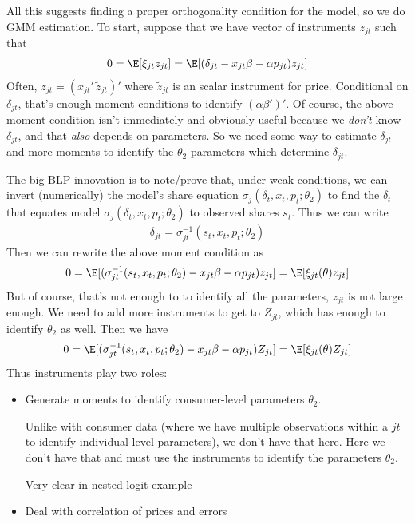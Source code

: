 \documentclass[12pt]{article}
\theoremstyle{plain}
\theoremstyle{definition}
\theoremstyle{remark}
\begin{document}
All this suggests finding a proper orthogonality condition for the
model, so we do GMM estimation.
To start, suppose that we have vector of instruments $z_{jt}$ such that
\begin{align*}
  0 = \E[\xi_{jt}z_{jt}]
  = \E[(\delta_{jt}-x_{jt}\beta-\alpha p_{jt})z_{jt}]
\end{align*}
Often, $z_{jt}=(x_{jt}'\,\tilde{z}_{jt})'$ where $\tilde{z}_{jt}$ is an
scalar instrument for price.
Conditional on $\delta_{jt}$, that's enough moment conditions to
identify $(\alpha \beta')'$.
Of course, the above moment condition isn't immediately and obviously
useful because we \emph{don't} know $\delta_{jt}$, and that \emph{also}
depends on parameters. So we need some way to estimate $\delta_{jt}$ and
more moments to identify the $\theta_2$ parameters which determine
$\delta_{jt}$.

The big BLP innovation is to note/prove that, under weak conditions, we
can invert (numerically) the model's share equation
$\sigma_j(\delta_t,x_t,p_t;\theta_2)$ to find the $\delta_t$
that equates model $\sigma_j(\delta_t,x_t,p_t;\theta_2)$ to
observed shares $s_t$.
Thus we can write
\begin{align*}
  \delta_{jt}=\sigma_{jt}^{-1}(s_t,x_t,p_t;\theta_2)
\end{align*}
Then we can rewrite the above moment condition as
\begin{align*}
  0
  = \E[(\sigma_{jt}^{-1}(s_t,x_t,p_t;\theta_2)-x_{jt}\beta-\alpha p_{jt})z_{jt}]
  = \E[\xi_{jt}(\theta)z_{jt}]
\end{align*}
But of course, that's not enough to to identify all the parameters,
$z_{jt}$ is not large enough. We need to add more instruments to get to
$Z_{jt}$, which has enough to identify $\theta_2$ as well. Then we have
\begin{align*}
  0
  = \E[(\sigma_{jt}^{-1}(s_t,x_t,p_t;\theta_2)-x_{jt}\beta-\alpha p_{jt})Z_{jt}]
  = \E[\xi_{jt}(\theta)Z_{jt}]
\end{align*}
Thus instruments play two roles:
\begin{itemize}
  \item Generate moments to identify consumer-level parameters
    $\theta_2$.

    Unlike with consumer data (where we have multiple observations
    within a $jt$ to identify individual-level parameters), we don't
    have that here.
    Here we don't have that and must use the instruments to identify the
    parameters $\theta_2$.

    Very clear in nested logit example

  \item Deal with correlation of prices and errors
\end{itemize}
\end{document}
